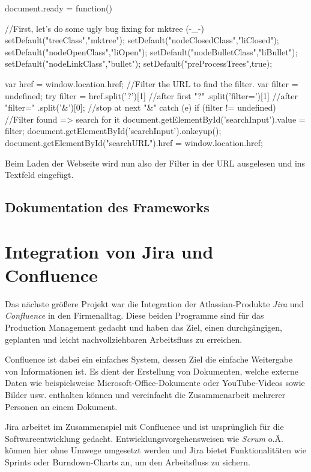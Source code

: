 \documentclass[xcolor=dvipsnames,11pt,paper=a4paper]{report}
\begin{document}
\begin{code}[language=javascript, caption={Filterung beim Laden der Seite}]
document.ready = function() {
	//First, let's do some ugly bug fixing for mktree (-_-)
	setDefault("treeClass","mktree");
	setDefault("nodeClosedClass","liClosed");
	setDefault("nodeOpenClass","liOpen");
	setDefault("nodeBulletClass","liBullet");
	setDefault("nodeLinkClass","bullet");
	setDefault("preProcessTrees",true);

	var href = window.location.href;
	//Filter the URL to find the filter.
	var filter = undefined;
	try {
		filter =	href.split('?')[1] //after first "?"
							.split('filter=')[1] //after "filter="
							.split('&')[0]; //stop at next "&"
	} catch (e) {}
	if (filter != undefined) {
		//Filter found => search for it
		document.getElementById('searchInput').value = filter;
		document.getElementById('searchInput').onkeyup();
	}
	document.getElementById("searchURL").href = window.location.href;
}
\end{code}

Beim Laden der Webseite wird nun also der Filter in der URL ausgelesen und ins Textfeld
eingefügt.



\section{Dokumentation des Frameworks}




\chapter{Integration von Jira und Confluence}

Das nächste größere Projekt war die Integration der Atlassian-Produkte \textit{Jira}
und \textit{Confluence} in den Firmenalltag. Diese beiden Programme sind für das
Production Management gedacht und haben das Ziel, einen durchgängigen, geplanten
und leicht nachvollziehbaren Arbeitsfluss zu erreichen.

Confluence ist dabei ein einfaches System, dessen Ziel die einfache Weitergabe von
Informationen ist. Es dient der Erstellung von Dokumenten, welche externe Daten
wie beispielsweise Microsoft-Office-Dokumente oder YouTube-Videos sowie Bilder usw.
enthalten können und vereinfacht die Zusammenarbeit mehrerer Personen an einem Dokument.

Jira arbeitet im Zusammenspiel mit Confluence und ist ursprünglich für die Softwareentwicklung
gedacht. Entwicklungsvorgehensweisen wie \textit{Scrum} o.Ä. können hier ohne Umwege
umgesetzt werden und Jira bietet Funktionalitäten wie Sprints oder Burndown-Charts
an, um den Arbeitsfluss zu sichern.
\end{document}
